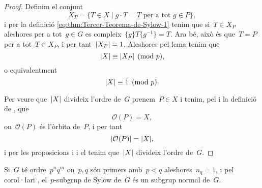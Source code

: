 \documentclass[../estructures-algebraiques.tex]{subfiles}
\begin{document}
\begin{proof}
        Definim el conjunt
        \[
            X_{P}=\{T\in X\mid g\cdot T=T\text{ per a tot }g\in P\},
        \]
        i per la definició \eqref{eq:thm:Tercer-Teorema-de-Sylow-1} tenim que si~\(T\in X_{P}\) aleshores per a tot~\(g\in G\) es compleix~\(\{g\}T\{g^{-1}\}=T\).
        Ara bé, això és que~\(T=P\) per a tot~\(T\in X_{P}\), i per tant~\(\abs{X_{P}}=1\).
        Aleshores pel lema  tenim que
        \[
            \abs{X}\equiv\abs{X_{P}}\pmod{p},
        \]
        o equivalentment
        \[
            \abs{X}\equiv1\pmod{p}.
        \]

        Per veure que~\(\abs{X}\) divideix l'ordre de~\(G\) prenem~\(P\in X\) i tenim, pel  i la definició de , que
        \[
            \mathcal{O}(P)=X,
        \]
        on~\(\mathcal{O}(P)\) és l'òrbita de~\(P\), i per tant
        \[
            \abs{\mathcal{O}(P)}=\abs{X},
        \]
        i per les proposicions  i  i el  tenim que~\(\abs{X}\) divideix l'ordre de~\(G\).
    \end{proof}
    \begin{corollary}
        Si~\(G\) té ordre~\(p^{n}q^{m}\) on~\(p,q\) són primers amb~\(p<q\) aleshores~\(n_{q}=1\), i pel corol·lari , el~\(p\)-subgrup de Sylow de~\(G\) és un subgrup normal de~\(G\).
    \end{corollary}
\end{document}
